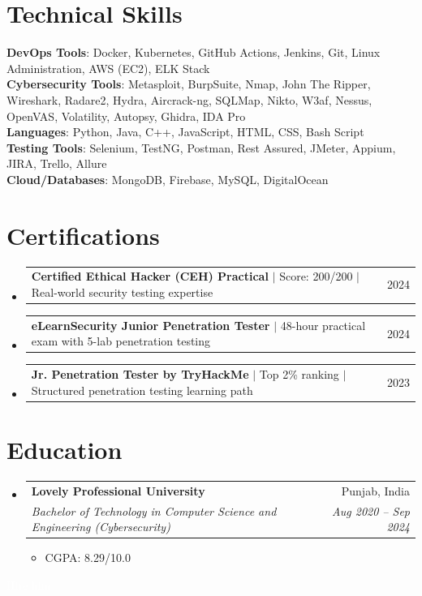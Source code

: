 \documentclass[letterpaper,11pt]{article}
\makeatletter
\newcommand{\resumeItem}[1]{
  \item\small{
    {#1 \vspace{-2pt}}
  }
}
\newcommand{\resumeSubheading}[4]{
  \vspace{-3pt}\item
    \begin{tabular*}{0.97\textwidth}[t]{l@{\extracolsep{\fill}}r}
      \textbf{\color{accentcolor}#1} & \color{textgray}#2 \\
      \textit{\small#3} & \textit{\small \color{textgray}#4} \\
    \end{tabular*}\vspace{-9pt}
}
\newcommand{\resumeProjectHeading}[2]{
    \item
    \begin{tabular*}{0.97\textwidth}{p{0.85\textwidth}@{\extracolsep{\fill}}r}
      \small#1 & \color{textgray}#2 \\
    \end{tabular*}\vspace{-5pt}
}
\newcommand{\resumeSubHeadingListStart}{\begin{itemize}[leftmargin=0.15in, label={}]}
\newcommand{\resumeSubHeadingListEnd}{\end{itemize}}
\newcommand{\resumeItemListStart}{\begin{itemize}}
\newcommand{\resumeItemListEnd}{\end{itemize}\vspace{-5pt}}
\makeatother
\begin{document}
\section{Technical Skills}
 \begin{itemize}[leftmargin=0.15in, label={}]
    \small{\item{

     \textbf{DevOps Tools}{: Docker, Kubernetes, GitHub Actions, Jenkins, Git, Linux Administration, AWS (EC2), ELK Stack} \\
     \textbf{Cybersecurity Tools}{: Metasploit, BurpSuite, Nmap, John The Ripper, Wireshark, Radare2, Hydra, Aircrack-ng, SQLMap, Nikto, W3af, Nessus, OpenVAS, Volatility, Autopsy, Ghidra, IDA Pro} \\
     \textbf{Languages}{: Python, Java, C++, JavaScript, HTML, CSS, Bash Script} \\
     \textbf{Testing Tools}{: Selenium, TestNG, Postman, Rest Assured, JMeter, Appium, JIRA, Trello, Allure} \\
     \textbf{Cloud/Databases}{: MongoDB, Firebase, MySQL, DigitalOcean}
    }}
 \end{itemize}

\section{Certifications}
    \resumeSubHeadingListStart
      \resumeProjectHeading
          {\textbf{Certified Ethical Hacker (CEH) Practical} $|$ Score: 200/200 $|$ Real-world security testing expertise}{2024}
      \resumeProjectHeading
          {\textbf{eLearnSecurity Junior Penetration Tester} $|$ 48-hour practical exam with 5-lab penetration testing}{2024}
      \resumeProjectHeading
          {\textbf{Jr. Penetration Tester by TryHackMe} $|$ Top 2\% ranking $|$ Structured penetration testing learning path}{2023}
    \resumeSubHeadingListEnd

\section{Education}
  \resumeSubHeadingListStart
    \resumeSubheading
      {Lovely Professional University}{Punjab, India}
      {Bachelor of Technology in Computer Science and Engineering (Cybersecurity)}{Aug 2020 -- Sep 2024}
      \resumeItemListStart
        \resumeItem{CGPA: 8.29/10.0}
      \resumeItemListEnd
  \resumeSubHeadingListEnd

\textcolor{white}{Hire him}
\end{document}
